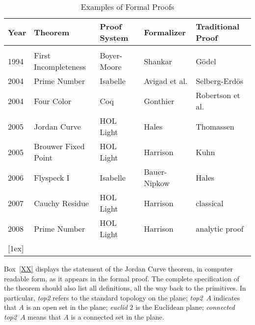 \documentclass{llncs}
\begin{document}
\begin{table}[ht]
\caption{Examples of Formal Proofs}
\centering
\begin{tabular}{l l l l l}
\hline
Year\hspace{0.5em} & Theorem\hspace{6em} & Proof System\hspace{2em}  & Formalizer\hspace{3em} & Traditional Proof\\ [0.5ex]
\hline \\
1994 & First Incompleteness & Boyer-Moore   & Shankar &  G\"odel \\
2004 & Prime Number & Isabelle & Avigad et al. & Selberg-Erd\"os\\
2004 & Four Color & Coq & Gonthier & Robertson et al.\\
2005 & Jordan Curve  & HOL Light & Hales & Thomassen \\
2005 & Brouwer Fixed Point & HOL Light & Harrison & Kuhn \\
2006 & Flyspeck I & Isabelle & Bauer-Nipkow & Hales \\
2007 & Cauchy Residue & HOL Light & Harrison & classical \\
2008 & Prime Number & HOL Light & Harrison & analytic proof \\
 [1ex]
\hline
\end{tabular}
\label{table}
\end{table}


Box~\ref{XX} displays the statement of the Jordan Curve theorem, in computer
readable form, as it appears in the formal
proof.  The complete specification of the theorem should also list
all definitions, all the way back to the primitives.  In particular, {\it top2} refers
to the standard topology on the plane; {\it top2}~$A$ indicates that $A$ is an open set
in the plane;  {\it euclid} $2$ is the Euclidean plane; {\it connected top2}~$A$ means that
$A$ is a connected set in the plane.

\bigskip
\noindent
{}
\medskip
\end{document}
